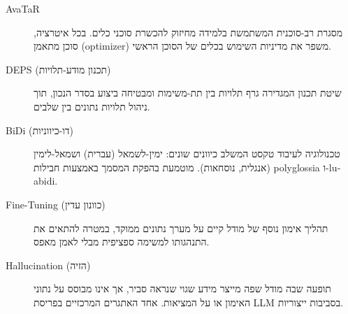 \begin{description}
\item[\textenglish{AvaTaR}]
מסגרת רב-סוכנית המשתמשת בלמידה מחיזוק להכשרת סוכני כלים. בכל איטרציה, סוכן מתאמן (\textenglish{optimizer}) משפר את מדיניות השימוש בכלים של הסוכן הראשי.

\item[\textenglish{DEPS} (תכנון מודע-תלויות)]
שיטת תכנון המגדירה גרף תלויות בין תת-משימות ומבטיחה ביצוע בסדר הנכון, תוך ניהול תלויות נתונים בין שלבים.

\item[\textenglish{BiDi} (דו-כיווניות)]
טכנולוגיה לעיבוד טקסט המשלב כיוונים שונים: ימין-לשמאל (עברית) ושמאל-לימין (אנגלית, נוסחאות). מוטמעת בהפקת המסמך באמצעות חבילות \textenglish{polyglossia} ו-\textenglish{luabidi}.

\item[\textenglish{Fine-Tuning} (כוונון עדין)]
תהליך אימון נוסף של מודל קיים על מערך נתונים ממוקד, במטרה להתאים את התנהגותו למשימה ספציפית מבלי לאמן מאפס.

\item[\textenglish{Hallucination} (הזיה)]
תופעה שבה מודל שפה מייצר מידע שגוי שנראה סביר, אך אינו מבוסס על נתוני האימון או על המציאות. אחד האתגרים המרכזיים בפריסת \textenglish{LLM} בסביבות ייצוריות.

\end{description}
